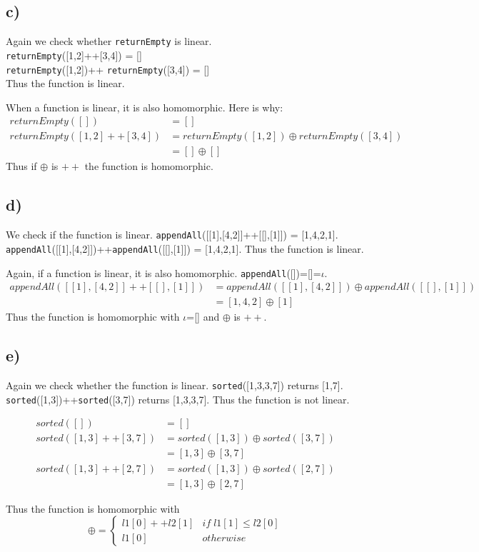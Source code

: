 \subsection*{c)}
Again we check whether \texttt{returnEmpty} is linear.\\
\texttt{returnEmpty}([1,2]++[3,4]) = []\\
\texttt{returnEmpty}([1,2])++ \texttt{returnEmpty}([3,4]) = []\\
Thus the function is linear.

When a function is linear, it is also homomorphic. Here is why:
\begin{align*}
returnEmpty([]) &=[]\\
returnEmpty([1,2]++[3,4]) &= returnEmpty([1,2]) \oplus returnEmpty([3,4])\\
&= [] \oplus []
\end{align*}
Thus if $\oplus$ is $++$ the function is homomorphic.

\subsection*{d)}
We check if the function is linear. \texttt{appendAll}([[1],[4,2]]++[[],[1]]) = [1,4,2,1].\\
\texttt{appendAll}([[1],[4,2]])++\texttt{appendAll}([[],[1]]) = [1,4,2,1]. Thus the function is linear.

Again, if a function is linear, it is also homomorphic. \texttt{appendAll}([])=[]=$\iota$.\\
\begin{align*}
appendAll([[1],[4,2]]++[[],[1]]) &= appendAll([[1],[4,2]]) \oplus appendAll([[],[1]])\\
&= [1,4,2] \oplus [1]
\end{align*}
Thus the function is homomorphic with $\iota$=[] and $\oplus$ is $++$.

\subsection*{e)}
Again we check whether the function is linear. \texttt{sorted}([1,3,3,7]) returns [1,7].\\
\texttt{sorted}([1,3])++\texttt{sorted}([3,7]) returns [1,3,3,7]. Thus the function is not linear.

\begin{align*}
sorted([]) &= []\\
sorted([1,3]++[3,7]) &= sorted([1,3]) \oplus sorted([3,7])\\
&= [1,3] \oplus [3,7]\\
sorted([1,3]++[2,7]) &= sorted([1,3]) \oplus sorted([2,7])\\
&= [1,3] \oplus [2,7]
\end{align*}

Thus the function is homomorphic with
$$\oplus = \left\{ \begin{array}{ll}
l1[0] ++ l2[1] & if \; l1[1] \leq l2[0] \\
l1[0] & otherwise
\end{array}\right.$$
